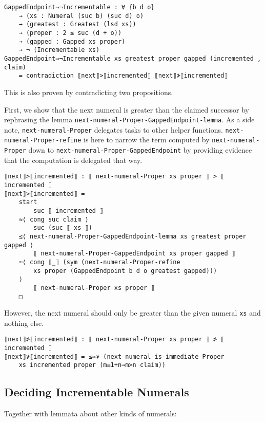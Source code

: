 \documentclass[\main/thesis.tex]{subfiles}
\begin{document}
\begin{lstlisting}[basicstyle=\ttfamily\scriptsize]
GappedEndpoint⇒¬Incrementable : ∀ {b d o}
    → (xs : Numeral (suc b) (suc d) o)
    → (greatest : Greatest (lsd xs))
    → (proper : 2 ≤ suc (d + o))
    → (gapped : Gapped xs proper)
    → ¬ (Incrementable xs)
GappedEndpoint⇒¬Incrementable xs greatest proper gapped (incremented , claim)
    = contradiction ⟦next⟧>⟦incremented⟧ ⟦next⟧≯⟦incremented⟧
\end{lstlisting}

This is also proven by contradicting two propositions.

First, we show that the next numeral is greater than the claimed successor
by rephrasing the lemma \lstinline|next-numeral-Proper-GappedEndpoint-lemma|.
As a side note, \lstinline|next-numeral-Proper| delegates tasks to other helper
functions. \lstinline|next-numeral-Proper-refine| is here to narrow the term
computed by \lstinline|next-numeral-Proper| down to
\lstinline|next-numeral-Proper-GappedEndpoint|
by providing evidence that the computation is delegated that way.

\begin{lstlisting}[basicstyle=\ttfamily\scriptsize]
⟦next⟧>⟦incremented⟧ : ⟦ next-numeral-Proper xs proper ⟧ > ⟦ incremented ⟧
⟦next⟧>⟦incremented⟧ =
    start
        suc ⟦ incremented ⟧
    ≈⟨ cong suc claim ⟩
        suc (suc ⟦ xs ⟧)
    ≤⟨ next-numeral-Proper-GappedEndpoint-lemma xs greatest proper gapped ⟩
        ⟦ next-numeral-Proper-GappedEndpoint xs proper gapped ⟧
    ≈⟨ cong ⟦_⟧ (sym (next-numeral-Proper-refine
        xs proper (GappedEndpoint b d o greatest gapped)))
    ⟩
        ⟦ next-numeral-Proper xs proper ⟧
    □
\end{lstlisting}

However, the next numeral should only be greater than the given numeral
\lstinline|xs| and nothing else.

\begin{lstlisting}[basicstyle=\ttfamily\scriptsize]
⟦next⟧≯⟦incremented⟧ : ⟦ next-numeral-Proper xs proper ⟧ ≯ ⟦ incremented ⟧
⟦next⟧≯⟦incremented⟧ = ≤⇒≯ (next-numeral-is-immediate-Proper
    xs incremented proper (m≡1+n⇒m>n claim))
\end{lstlisting}

\subsection{Deciding Incrementable Numerals}

Together with lemmata about other kinds of numerals:
\end{document}
